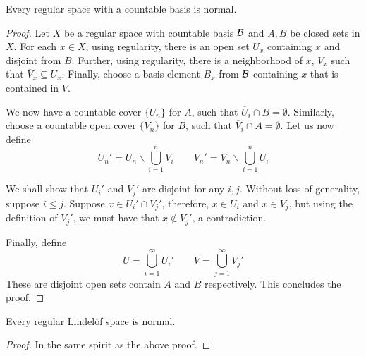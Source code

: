 \begin{theorem}
    Every regular space with a countable basis is normal.
\end{theorem}
\begin{proof}
    Let $X$ be a regular space with countable basis $\mathcal{B}$ and $A,B$ be closed sets in $X$. For each $x\in X$, using regularity, there is an open set $U_x$ containing $x$ and disjoint from $B$. Further, using regularity, there is a neighborhood of $x$, $V_x$ such that $\overline{V}_x\subseteq U_x$. Finally, choose a basis element $B_x$ from $\mathcal{B}$ containing $x$ that is contained in $V$.

    We now have a countable cover $\{U_n\}$ for $A$, such that $\overline{U}_i\cap B = \emptyset$. Similarly, choose a countable open cover $\{V_n\}$ for $B$, such that $\overline{V}_i\cap A = \emptyset$. Let us now define 
    \begin{equation*}
        U_n' = U_n\backslash\bigcup_{i = 1}^n\overline{V}_i 
        \qquad 
        V_n' = V_n\backslash\bigcup_{i = 1}^n\overline{U}_i 
    \end{equation*}

    We shall show that $U_i'$ and $V_j'$ are disjoint for any $i,j$. Without loss of generality, suppose $i\le j$. Suppose $x\in U_i'\cap V_j'$, therefore, $x\in U_i$ and $x\in V_j$, but using the definition of $V_j'$, we must have that $x\notin V_j'$, a contradiction.

    Finally, define 
    \begin{equation*}
        U = \bigcup_{i = 1}^\infty U_i'\qquad V = \bigcup_{j = 1}^\infty V_j'
    \end{equation*}
    These are disjoint open sets contain $A$ and $B$ respectively. This concludes the proof.
\end{proof}

\begin{corollary}
    Every regular Lindel\"of space is normal.
\end{corollary}
\begin{proof}
    In the same spirit as the above proof.
\end{proof}


